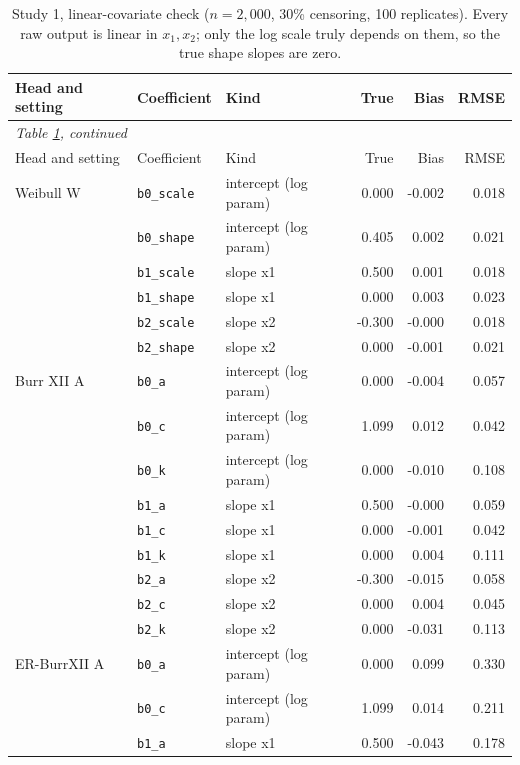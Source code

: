 {\small
\begin{longtable}{lllrrr}
\caption{Study 1, linear-covariate check ($n = 2{,}000$, 30\% censoring, 100 replicates). Every raw output is linear in $x_1, x_2$; only the log scale truly depends on them, so the true shape slopes are zero.}\label{stab:covariate}\\
\toprule
Head and setting & Coefficient & Kind & True & Bias & RMSE \\
\midrule
\endfirsthead
\multicolumn{6}{l}{\emph{Table \ref{stab:covariate}, continued}}\\
\toprule
Head and setting & Coefficient & Kind & True & Bias & RMSE \\
\midrule
\endhead
\bottomrule
\endfoot
Weibull W & \texttt{b0\_scale} & intercept (log param) & 0.000 & -0.002 & 0.018 \\
 & \texttt{b0\_shape} & intercept (log param) & 0.405 & 0.002 & 0.021 \\
 & \texttt{b1\_scale} & slope x1 & 0.500 & 0.001 & 0.018 \\
 & \texttt{b1\_shape} & slope x1 & 0.000 & 0.003 & 0.023 \\
 & \texttt{b2\_scale} & slope x2 & -0.300 & -0.000 & 0.018 \\
 & \texttt{b2\_shape} & slope x2 & 0.000 & -0.001 & 0.021 \\
Burr XII A & \texttt{b0\_a} & intercept (log param) & 0.000 & -0.004 & 0.057 \\
 & \texttt{b0\_c} & intercept (log param) & 1.099 & 0.012 & 0.042 \\
 & \texttt{b0\_k} & intercept (log param) & 0.000 & -0.010 & 0.108 \\
 & \texttt{b1\_a} & slope x1 & 0.500 & -0.000 & 0.059 \\
 & \texttt{b1\_c} & slope x1 & 0.000 & -0.001 & 0.042 \\
 & \texttt{b1\_k} & slope x1 & 0.000 & 0.004 & 0.111 \\
 & \texttt{b2\_a} & slope x2 & -0.300 & -0.015 & 0.058 \\
 & \texttt{b2\_c} & slope x2 & 0.000 & 0.004 & 0.045 \\
 & \texttt{b2\_k} & slope x2 & 0.000 & -0.031 & 0.113 \\
ER-BurrXII A & \texttt{b0\_a} & intercept (log param) & 0.000 & 0.099 & 0.330 \\
 & \texttt{b0\_c} & intercept (log param) & 1.099 & 0.014 & 0.211 \\
 & \texttt{b1\_a} & slope x1 & 0.500 & -0.043 & 0.178 \\

\end{longtable}}

